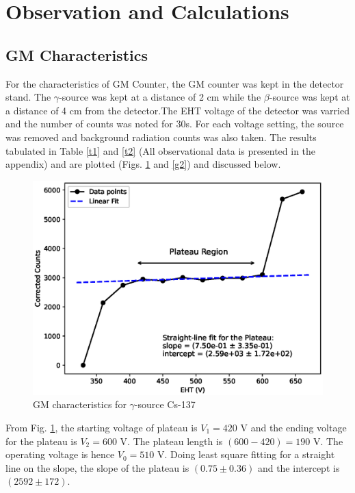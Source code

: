 \section{Observation and Calculations}

\subsection{GM Characteristics}
For the characteristics of GM Counter, the GM counter was kept in the detector stand. The $\gamma$-source was kept at a distance of 2 cm while the $\beta$-source was kept at a distance of 4 cm from the detector.The EHT voltage of the detector was varried and the number of counts was noted for 30s. For each voltage setting, the source was removed and background radiation counts was also taken. The results tabulated in Table \ref{t1} and \ref{t2} (All observational data is presented in the appendix) and are plotted (Figs. \ref{g1} and \ref{g2}) and discussed below.

\begin{figure}[H]
    \centering
    \includegraphics[width=1\columnwidth]{images/calib-gamma.eps}
    \caption{GM characteristics for $\gamma$-source Cs-137}
    \label{g1}
\end{figure}

From Fig. \ref{g1}, the starting voltage of plateau is $V_1=420$ V and the ending voltage for the plateau is $V_2=600$ V.
The plateau length is $(600-420)=190$ V. The operating voltage is hence $V_0=510$ V. Doing least square fitting for a straight line on the slope, the slope of the plateau is $(0.75 \pm 0.36)$ and the intercept is $(2592 \pm 172)$.

